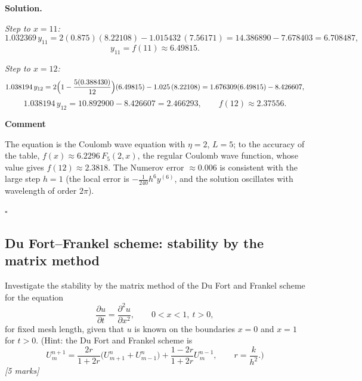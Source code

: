 \documentclass[11pt,a4paper]{article}
\newenvironment{solution}
  {\par\noindent\textbf{Solution.}\par\nobreak}
  {\par\hfill\(\square\)\par}
\newcommand{\step}[1]{\par\addvspace{0.5em}\noindent\textbf{#1}\par\nobreak}
\newcommand{\mk}[1]{\hfill\textit{[#1 marks]}}
\newcommand{\pd}[2]{\frac{\partial #1}{\partial #2}}
\newcommand{\pdd}[2]{\frac{\partial^2 #1}{\partial #2^2}}
\begin{document}
\begin{solution}
\textit{Step to \(x=11\):}
\[
  1.032369\,y_{11}=2(0.875)(8.22108)-1.015432\,(7.56171)
  =14.386890-7.678403=6.708487,
\]
\[
  y_{11}=f(11)\approx6.49815 .
\]

\textit{Step to \(x=12\):}
\[
  1.038194\,y_{12}=2\Bigl(1-\frac{5(0.388430)}{12}\Bigr)(6.49815)-1.025\,(8.22108)
  =1.676309(6.49815)-8.426607,
\]
\[
  1.038194\,y_{12}=10.892900-8.426607=2.466293,
  \qquad
  \boxed{f(12)\approx2.37556 .}
\]

\step{Comment}
The equation is the Coulomb wave equation with \(\eta=2\), \(L=5\);
to the accuracy of the table, \(f(x)\approx6.2296\,F_5(2,x)\), the
regular Coulomb wave function, whose value gives \(f(12)\approx2.3818\).
The Numerov error \(\approx0.006\) is consistent with the large step
\(h=1\) (the local error is \(-\frac1{240}h^6y^{(6)}\), and the solution
oscillates with wavelength of order \(2\pi\)).
\end{solution}

\subsection{Du Fort--Frankel scheme: stability by the matrix method}

\begin{qbox}
Investigate the stability by the matrix method of the Du Fort and
Frankel scheme for the equation
\[
  \pd ut=\pdd ux,\qquad 0<x<1,\ t>0,
\]
for fixed mesh length, given that \(u\) is known on the boundaries
\(x=0\) and \(x=1\) for \(t>0\).  (Hint: the Du Fort and Frankel scheme
is
\[
  U_m^{n+1}=\frac{2r}{1+2r}\bigl(U_{m+1}^n+U_{m-1}^n\bigr)
  +\frac{1-2r}{1+2r}U_m^{n-1},\qquad r=\frac k{h^2}.)
\]\mk{5}
\end{qbox}
\end{document}
